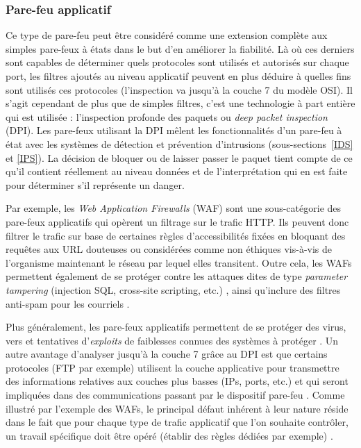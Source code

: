 \documentclass[]{article}
\begin{document}
\subsubsection{Pare-feu applicatif}\label{appfw}

\par Ce type de pare-feu peut être considéré comme une extension complète aux simples pare-feux à états dans le but d'en améliorer la fiabilité. Là où ces derniers sont capables de déterminer quels protocoles sont utilisés et autorisés sur chaque port, les filtres ajoutés au niveau applicatif peuvent en plus déduire à quelles fins sont utilisés ces protocoles (l'inspection va jusqu'à la couche 7 du modèle OSI). Il s'agit cependant de plus que de simples filtres, c'est une technologie à part entière qui est utilisée : l'inspection profonde des paquets ou \textit{deep packet inspection} (DPI). Les pare-feux utilisant la DPI mêlent les fonctionnalités d'un pare-feu à état avec les systèmes de détection et prévention d'intrusions (sous-sections~\ref{IDS} et \ref{IPS}). La décision de bloquer ou de laisser passer le paquet tient compte de ce qu'il contient réellement au niveau données et de l'interprétation qui en est faite pour déterminer s'il représente un danger.\\

\label{waf}
\par Par exemple, les \textit{Web Application Firewalls} (WAF) sont une sous-catégorie des pare-feux applicatifs qui opèrent un filtrage sur le trafic HTTP. Ils peuvent donc filtrer le trafic sur base de certaines règles d'accessibilités fixées en bloquant des requêtes aux URL douteuses ou considérées comme non éthiques vis-à-vis de l'organisme maintenant le réseau par lequel elles transitent. Outre cela, les WAFs permettent également de se protéger contre les attaques dites de type \textit{parameter tampering} (injection SQL, cross-site scripting, etc.) \cite{Palka2011}, ainsi qu'inclure des filtres anti-spam pour les courriels \cite{wikifwFR}.\\

\par Plus généralement, les pare-feux applicatifs permettent de se protéger des virus, vers et tentatives d'\textit{exploits} de faiblesses connues des systèmes à protéger \cite{wikiappfw} \cite{Palka2011}. Un autre avantage d'analyser jusqu'à la couche 7 grâce au DPI est que certains protocoles (FTP par exemple) utilisent la couche applicative pour transmettre des informations relatives aux couches plus basses (IPs, ports, etc.) et qui seront impliquées dans des communications passant par le dispositif pare-feu \cite{wikifwFR}. Comme illustré par l'exemple des WAFs, le principal défaut inhérent à leur nature réside dans le fait que pour chaque type de trafic applicatif que l'on souhaite contrôler, un travail spécifique doit être opéré (établir des règles dédiées par exemple) \cite{wikifw}. 
\end{document}
